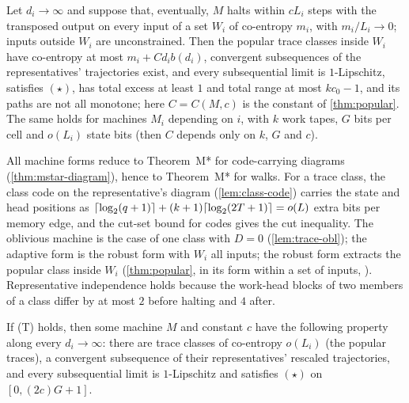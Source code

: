 \begin{theorem}\label{thm:mstar-robust}
Let $d_i\to\infty$ and suppose that, eventually, $M$ halts within $cL_i$ steps with the
transposed output on every input of a set $W_i$ of co-entropy $m_i$, with $m_i/L_i\to0$; inputs
outside $W_i$ are unconstrained. Then the popular trace classes inside $W_i$ have co-entropy at most
$m_i+Cd_ib(d_i)$, convergent subsequences of the representatives' trajectories exist, and every
subsequential limit is $1$-Lipschitz, satisfies $(\star)$, has total excess at least $1$ and total
range at most $kc_0-1$, and its paths are not all monotone; here $C=C(M,c)$ is the constant of
\cref{thm:popular}. The same holds for machines $M_i$ depending on $i$, with $k$ work tapes, $G$ bits per cell
and $o(L_i)$ state bits (then $C$ depends only on $k$, $G$ and $c$).
\end{theorem}

\begin{outline}
All machine forms reduce to Theorem~M* for code-carrying diagrams (\cref{thm:mstar-diagram}),
hence to Theorem~M* for walks. For a trace class, the class code on the representative's diagram
(\cref{lem:class-code}) carries the state and head positions as
$\lceil \log_2 (q+1) \rceil+(k+1)\lceil \log_2 (2T+1) \rceil=o(L)$ extra bits per memory edge, and the cut-set bound for codes
gives the cut inequality. The oblivious machine is the case of one class with $D=0$
(\cref{lem:trace-obl}); the adaptive form is the robust form with $W_i$ all inputs; the robust form
extracts the popular class inside $W_i$ (\cref{thm:popular}, in its form within a set of inputs,
). Representative independence holds
because the work-head blocks of two members of a class differ by at most $2$ before halting and $4$
after.
\end{outline}

\begin{corollary}\label{cor:mstar-T}
If (T) holds, then some machine $M$ and constant $c$ have the following property along every
$d_i\to\infty$: there are trace classes of co-entropy $o(L_i)$ (the popular traces), a convergent
subsequence of their representatives' rescaled trajectories, and every subsequential limit is
$1$-Lipschitz and satisfies $(\star)$ on $[0,(2c)G+1]$.
\end{corollary}


